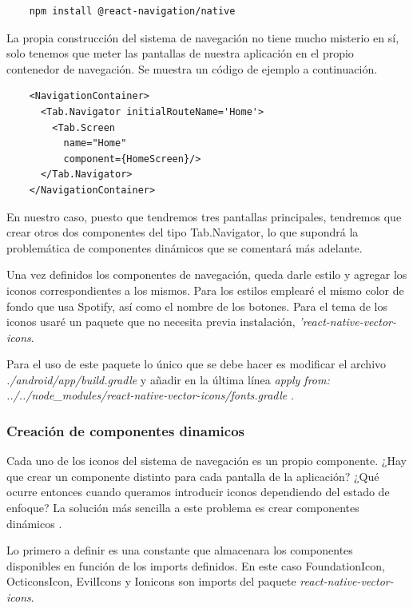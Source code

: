 \documentclass[a4paper, 11pt]{article}
\begin{document}
\begin{lstlisting}
    npm install @react-navigation/native
\end{lstlisting}

La propia construcción del sistema de navegación no tiene mucho misterio en sí, solo tenemos que meter las pantallas de
nuestra aplicación en el propio contenedor de navegación. Se muestra un código de ejemplo a continuación.

\begin{lstlisting}
    <NavigationContainer>
      <Tab.Navigator initialRouteName='Home'>
        <Tab.Screen
          name="Home"
          component={HomeScreen}/>
      </Tab.Navigator>
    </NavigationContainer>
\end{lstlisting}

En nuestro caso, puesto que tendremos tres pantallas principales, tendremos que crear otros dos componentes del tipo
Tab.Navigator, lo que supondrá la problemática de componentes dinámicos que se comentará más adelante.

Una vez definidos los componentes de navegación, queda darle estilo y agregar los iconos correspondientes a los mismos.
Para los estilos emplearé el mismo color de fondo que usa Spotify, así como el nombre de los botones. Para el tema de
los iconos usaré un paquete que no necesita previa instalación, \emph{'react-native-vector-icons}.

Para el uso de este paquete lo único que se debe hacer es modificar el archivo \emph{./android/app/build.gradle} y añadir
en la última línea \emph{apply from: ../../node\_modules/react-native-vector-icons/fonts.gradle} \cite{vector-icons-issue}.

\subsubsection{Creación de componentes dinamicos}

Cada uno de los iconos del sistema de navegación es un propio componente. ¿Hay que crear un componente distinto para
cada pantalla de la aplicación? ¿Qué ocurre entonces cuando queramos introducir iconos dependiendo del estado de enfoque?
La solución más sencilla a este problema es crear componentes dinámicos \cite{dynamic-components}.

Lo primero a definir es una constante que almacenara los componentes disponibles en función de los imports definidos. En 
este caso FoundationIcon, OcticonsIcon, EvilIcons y Ionicons son imports del paquete \emph{react-native-vector-icons}.
\end{document}

